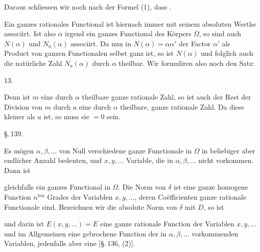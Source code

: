 
Daraus schliessen wir noch nach der Formel (1), dass .

Ein ganzes rationales Functional ist hiernach immer mit seinem absoluten Werthe associirt. Ist also $\alpha$ irgend ein ganzes Functional des Körpers $\overline{\Omega}$, so sind auch $N(\alpha)$ und $N_a(\alpha)$ associirt. Da nun in $N(\alpha)=\alpha\alpha'$ der Factor $\alpha'$ als Product von ganzen Functionalen selbst ganz ist, so ist $N(\alpha)$ und folglich auch die natürliche Zahl $N_a(\alpha)$ durch $\alpha$ theilbar. Wir formuliren also noch den Satz:

13. 

Denn ist $m$ eine durch $\alpha$ theilbare ganze rationale Zahl, so ist auch der Rest der Division von $m$ durch $a$ eine durch $\alpha$ theilbare, ganze rationale Zahl. Da diese kleiner als $a$ ist, so muss sie $=0$ sein.

\S.\,139.


Es mögen $\alpha, \beta, \ldots$ von Null verschiedene ganze Functionale in $\Omega$ in beliebiger aber endlicher Anzahl bedeuten, und $x, y, \ldots$ Variable, die in $\alpha, \beta, \ldots$ nicht vorkommen. Dann ist


gleichfalls ein ganzes Functional in $\Omega$. Die Norm von $\delta$ ist eine ganze homogene Function $n^{\text{ten}}$ Grades der Variablen $x, y, \ldots$, deren Coëfficienten ganze rationale Functionale sind. Bezeichnen wir die absolute Norm von $\delta$ mit $D$, so ist


und darin ist $E(x, y, \ldots) = E$ eine ganze rationale Function der Variablen $x, y, \ldots$ und im Allgemeinen eine gebrochene Function der in $\alpha, \beta, \ldots$ vorkommenden Variablen, jedenfalls aber eine  [\S.\,136, (2)].
